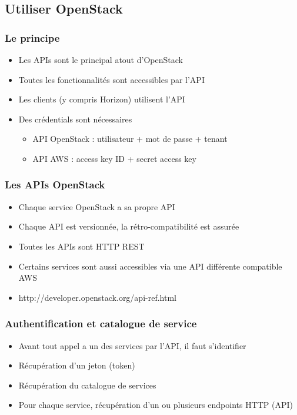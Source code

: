   \subsection[Utilisation]{Utiliser OpenStack}

  \begin{frame}
    \frametitle{Le principe}
    \begin{itemize}
      \item Les APIs sont le principal atout d'OpenStack
      \item Toutes les fonctionnalités sont accessibles par l'API
      \item Les clients (y compris Horizon) utilisent l'API
      \item Des crédentials sont nécessaires
      \begin{itemize}
        \item API OpenStack : utilisateur + mot de passe + tenant
        \item API AWS : access key ID + secret access key
      \end{itemize}
    \end{itemize}
  \end{frame}

  \begin{frame}
    \frametitle{Les APIs OpenStack}
    \begin{itemize}
      \item Chaque service OpenStack a sa propre API
      \item Chaque API est versionnée, la rétro-compatibilité est assurée
      \item Toutes les APIs sont HTTP REST
      \item Certains services sont aussi accessibles via une API différente compatible AWS
      \item http://developer.openstack.org/api-ref.html
    \end{itemize}
  \end{frame}

  \begin{frame}
    \frametitle{Authentification et catalogue de service}
    \begin{itemize}
      \item Avant tout appel a un des services par l'API, il faut s'identifier
      \item Récupération d'un jeton (token)
      \item Récupération du catalogue de services
      \item Pour chaque service, récupération d'un ou plusieurs endpoints HTTP (API)
    \end{itemize}
  \end{frame}


